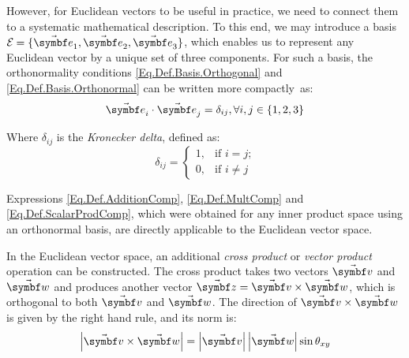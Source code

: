 However, for Euclidean vectors to be useful in practice, we need to connect them to a systematic mathematical description. To this end, we may introduce a basis $\basis = \{\vasub{e}{1},\vasub{e}{2},\vasub{e}{3}\}$, which enables us to represent any Euclidean vector by a unique set of three components. For such a basis, the orthonormality conditions \eqref{Eq.Def.Basis.Orthogonal} and \eqref{Eq.Def.Basis.Orthonormal} can be written more compactly~as:
\begin{equation} \label{Eq.Res.Basis.OrthKronecker}
\vasub{\bv}{i} \cdot \vasub{\bv}{j}=\delta_{ij}, \forall i,j\in\{1,2,3\}
\end{equation}

Where $\delta_{ij}$ is the \emph{Kronecker delta}, defined as:
\begin{equation} \label{Eq.Def.Kronecker}
\delta_{ij}=
\begin{cases}
1, &\text{if $i=j$;}\\
0, &\text{if $i\neq j$}
\end{cases}
\end{equation}

Expressions \eqref{Eq.Def.AdditionComp}, \eqref{Eq.Def.MultComp} and \eqref{Eq.Def.ScalarProdComp}, which were obtained for any inner product space using an orthonormal basis, are directly applicable to the Euclidean vector space.

In the Euclidean vector space, an additional \emph{cross product} or \emph{vector product} operation can be constructed. The cross product takes two vectors $\vabs{v}$ and $\vabs{w}$ and produces another vector $\vabs{z}=\vabs{v}\times\vabs{w}$, which is orthogonal to both $\vabs{v}$ and $\vabs{w}$. The direction of $\vabs{v}\times\vabs{w}$ is given by the right hand rule, and its norm is:
\begin{equation} \label{Eq.Def.CrossProdNorm}
\norm{\vabs{v}\times\vabs{w}}=\norm{\vabs{v}}\norm{\vabs{w}}\sin\theta_{xy}
\end{equation}

